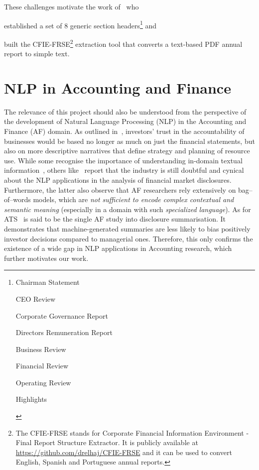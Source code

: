 These challenges motivate the work of~\cite{elhaj2019multilingual} who \begin{enumerate*}[label=(\alph*)]
    \item established a set of 8 generic section headers\footnote{
        \begin{enumerate*}
            \item Chairman Statement
            \item CEO Review
            \item Corporate Governance Report
            \item Directors Remuneration Report
            \item Business Review
            \item Financial Review
            \item Operating Review
            \item Highlights
        \end{enumerate*}
    } and
    \item built the CFIE-FRSE\footnote{
        The CFIE-FRSE stands for Corporate Financial Information Environment - Final Report Structure Extractor.
        It is publicly available at \url{https://github.com/drelhaj/CFIE-FRSE} and it can be used to convert English, Spanish and Portuguese annual reports.
    } extraction tool that converts a text-based PDF annual report to simple text.
\end{enumerate*}

\section{NLP in Accounting and Finance}\label{sec:nlp-in-accounting-and-finance}
The relevance of this project should also be understood from the perspective of the development of Natural Language Processing (NLP) in the Accounting and Finance (AF) domain.
As outlined in~\cite{elliott1998accounting}, investors' trust in the accountability of businesses would be based no longer as much on just the financial statements, but also on more descriptive narratives that define strategy and planning of resource use.
While some recognise the importance of understanding in-domain textual information~\cite{li2010textual}, others like~\cite{el-haj2019meaning} report that the industry is still doubtful and cynical about the NLP applications in the analysis of financial market disclosures.
Furthermore, the latter also observe that AF researchers rely extensively on bag--of--words models, which are \emph{not sufficient to encode complex contextual and semantic meaning} (especially in a domain with such \emph{specialized language}).
As for ATS~\cite{hollander-white-af} is said to be the single AF study into disclosure summarisation.
It demonstrates that machine-generated summaries are less likely to bias positively investor decisions compared to managerial ones.
Therefore, this only confirms the existence of a wide gap in NLP applications in Accounting research, which further motivates our work.

